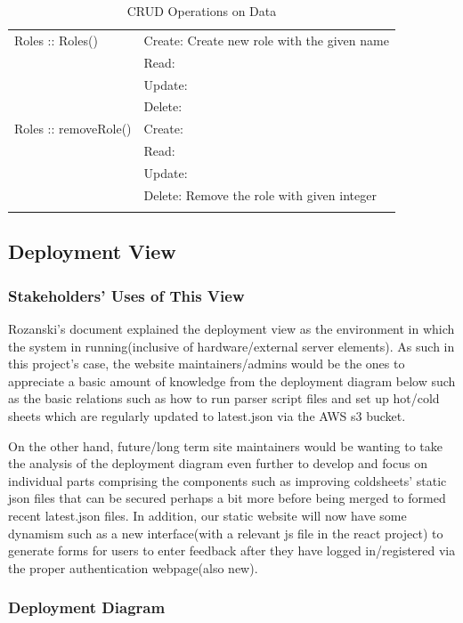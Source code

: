 \begin{longtable}{|p{.3\linewidth}|p{.7\linewidth}|}
    Roles :: Roles() & Create: Create new role with the given name \\
                   & Read: \\
                   & Update: \\
                   & Delete: \\ \hline
    Roles :: removeRole() & Create: \\
                        & Read: \\
                        & Update: \\
                        & Delete: Remove the role with given integer \\ \hline
  \caption{CRUD Operations on Data}
\end{longtable}

\vspace*{\fill}
\newpage

\subsection{Deployment View}

\subsubsection{Stakeholders' Uses of This View}

Rozanski’s document explained the deployment view as the environment in which the system in running(inclusive of hardware/external server elements). As such in this project’s case, the website maintainers/admins would be the ones to appreciate a basic amount of knowledge from the deployment diagram below such as the basic relations such as how to run parser script files and set up hot/cold sheets which are regularly updated to latest.json via the AWS s3 bucket. 

On the other hand, future/long term site maintainers would be wanting to take the analysis of the deployment diagram even further to develop and focus on individual parts comprising the components such as improving coldsheets’ static json files that can be secured perhaps a bit more before being merged to formed recent latest.json files. In addition, our static website will now have some dynamism such as a new interface(with a relevant js file in the react project) to generate forms for users to enter feedback after they have logged in/registered via the proper authentication webpage(also new).


\subsubsection{Deployment Diagram}

